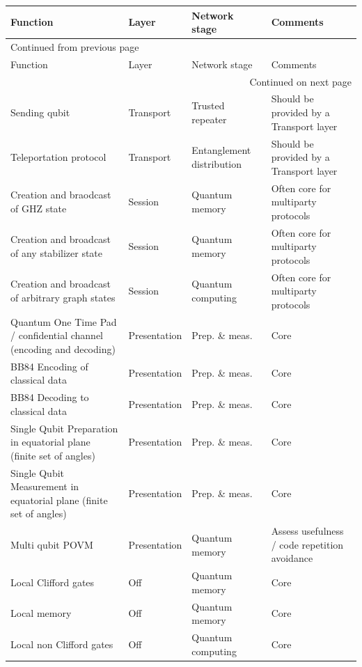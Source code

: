 \documentclass[11pt]{article}
\begin{document}
\begin{longtable}{p{}|p{}|p{}|p{}}
Function & Layer & Network stage & Comments\\
\hline
\endfirsthead
\multicolumn{4}{l}{Continued from previous page} \\
\hline

Function & Layer & Network stage & Comments \\

\hline
\endhead
\hline\multicolumn{4}{r}{Continued on next page} \\
\endfoot
\endlastfoot
\hline
Sending qubit & Transport & Trusted repeater & Should be provided by a Transport layer\\
\hline
Teleportation protocol & Transport & Entanglement distribution & Should be provided by a Transport layer\\
\hline
Creation and braodcast of GHZ state & Session & Quantum memory & Often core for multiparty protocols\\
\hline
Creation and broadcast of any stabilizer state & Session & Quantum memory & Often core for multiparty protocols\\
\hline
Creation and broadcast of arbitrary graph states & Session & Quantum computing & Often core for multiparty protocols\\
\hline
Quantum One Time Pad / confidential channel (encoding and decoding) & Presentation & Prep. \& meas. & Core\\
\hline
BB84 Encoding of classical data & Presentation & Prep. \& meas. & Core\\
\hline
BB84 Decoding to classical data & Presentation & Prep. \& meas. & Core\\
\hline
Single Qubit Preparation in equatorial plane (finite set of angles) & Presentation & Prep. \& meas. & Core\\
\hline
Single Qubit Measurement in equatorial plane (finite set of angles) & Presentation & Prep. \& meas. & Core\\
\hline
Multi qubit POVM & Presentation & Quantum memory & Assess usefulness / code repetition avoidance\\
\hline
Local Clifford gates & Off & Quantum memory & Core\\
\hline
Local memory & Off & Quantum memory & Core\\
\hline
Local non Clifford gates & Off & Quantum computing & Core\\

\end{longtable}
\end{document}
